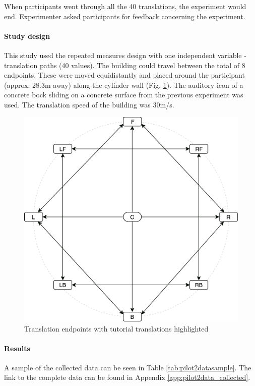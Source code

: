 When participants went through all the 40 translations, the experiment would end. Experimenter asked participants for feedback concerning the experiment.


\paragraph{Study design}
This study used the repeated measures design with one independent variable - translation paths (40 values).
The building could travel between the total of 8 endpoints. These were moved equidistantly and  placed around the participant (approx. 28.3m away) along the cylinder wall (Fig. \ref{fig:pilot2endpoints}).
The auditory icon of a concrete bock sliding on a concrete surface from the previous experiment was used. The translation speed of the building was 30m/s.

\begin{figure}
	\centering
	\includegraphics[width=0.5\linewidth]{figures/pilot2_endpoints}
	\caption{Translation endpoints with tutorial translations highlighted}
	\label{fig:pilot2endpoints}
\end{figure}

\paragraph{Results}

A sample of the collected data can be seen in Table \ref{tab:pilot2datasample}. The link to the complete data can be found in Appendix \ref{app:pilot2data_collected}.

